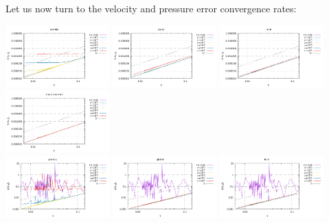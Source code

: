 Let us now turn to the velocity and pressure error convergence rates: 
\begin{center}
\includegraphics[width=4cm]{python_codes/fieldstone_115/results/dh/errorsV_penalty.pdf}
\includegraphics[width=4cm]{python_codes/fieldstone_115/results/dh/errorsV_global.pdf}
\includegraphics[width=4cm]{python_codes/fieldstone_115/results/dh/errorsV_local.pdf}
\includegraphics[width=4cm]{python_codes/fieldstone_115/results/dh/errorsV_macro.pdf}\\
\includegraphics[width=4cm]{python_codes/fieldstone_115/results/dh/errorsP_penalty.pdf}
\includegraphics[width=4cm]{python_codes/fieldstone_115/results/dh/errorsP_global.pdf}
\includegraphics[width=4cm]{python_codes/fieldstone_115/results/dh/errorsP_local.pdf}

\end{center}
